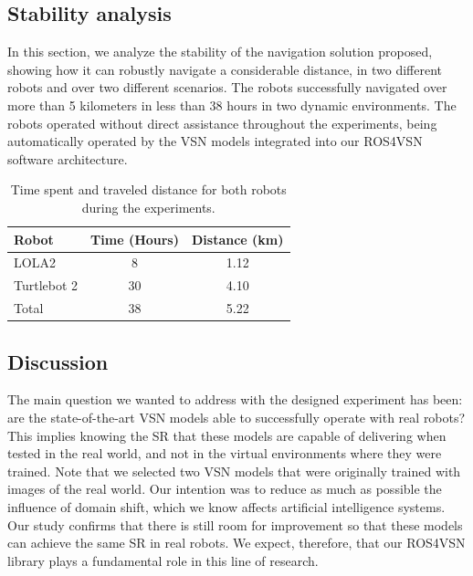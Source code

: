 \subsection{Stability analysis}
\label{subsec:marathon}

In this section, we analyze the stability of the navigation solution proposed, showing how it can robustly navigate a considerable distance, in two different robots and over two different scenarios.
The robots successfully navigated over more than 5 kilometers in less than 38 hours in two dynamic environments.
The robots operated without direct assistance throughout the experiments, being automatically operated by the VSN models integrated into our ROS4VSN software architecture.

\begin{table}
    \centering
    \begin{tabular}{l|cc}
        \toprule
        \textbf{Robot} & Time (Hours) & Distance (km) \\
        \midrule
        LOLA2       & 8     & 1.12 \\
        Turtlebot 2 & 30    & 4.10 \\\midrule
        Total       & 38    & 5.22 \\
        \bottomrule
    \end{tabular}
    \caption{Time spent and traveled distance for both robots during the experiments.}
    \label{tab:stability}
\end{table}

\subsection{Discussion}
\label{subsec:discussion}
The main question we wanted to address with the designed experiment has been: are the state-of-the-art VSN models able to successfully operate with real robots?
This implies knowing the SR that these models are capable of delivering when tested in the real world, and not in the virtual environments where they were trained.
Note that we selected two VSN models that were originally trained with images of the real world.
Our intention was to reduce as much as possible the influence of domain shift, which we know affects artificial intelligence systems.
Our study confirms that there is still room for improvement so that these models can achieve the same SR in real robots.
We expect, therefore, that our ROS4VSN library plays a fundamental role in this line of research.


